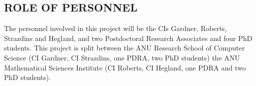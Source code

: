 
\subsection*{ROLE OF PERSONNEL}

%

The personnel involved in this project will be the CIs Gardner,
Roberts, Strazdins and Hegland, 
and
two Postdoctoral Research Associates and four PhD students.  This
project is split between the ANU Research School of Computer Science
(CI Gardner, CI Strazdins, one PDRA, two PhD students) the ANU
Mathematical Sciences Institute (CI Roberts, CI Hegland, one PDRA and
two PhD students).


